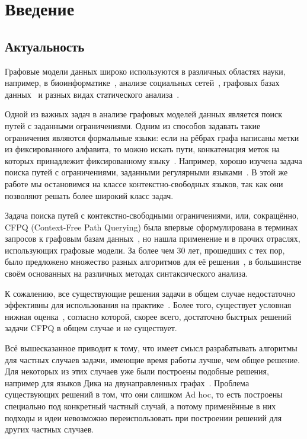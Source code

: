 \section*{Введение}

\subsection*{Актуальность}

Графовые модели данных широко используются в различных областях науки, например, в биоинформатике~\cite{Sevon08}, анализе социальных сетей~\cite{Zarrinkalam14, Chaudhary16}, графовых базах данных~\cite{Medeiros18,Yannakakis1990} и разных видах статического анализа~\cite{Reps1998}. 

Одной из важных задач в анализе графовых моделей данных является поиск путей с заданными ограничениями. Одним из способов задавать такие ограничения являются формальные языки: если на рёбрах графа написаны метки из фиксированного алфавита, то можно искать пути, конкатенация меток на которых принадлежит фиксированному языку~\cite{Barrett00}. Например, хорошо изучена задача поиска путей с ограничениями, заданными регулярными языками~\cite{Mendelzon1995}. В этой же работе мы остановимся на классе контекстно-свободных языков, так как они позволяют решать более широкий класс задач.

Задача поиска путей с контекстно-свободными ограничениями, или, сокращённо, CFPQ (Context-Free Path Querying) была впервые сформулирована в терминах запросов к графовым базам данных~\cite{Yannakakis1990}, но нашла применение и в прочих отраслях, использующих графовые модели. За более чем 30 лет, прошедших с тех пор, было предложено множество разных алгоритмов для её решения~\cite{Reps97, Hellings15, Santos18}, в большинстве своём основанных на различных методах синтаксического анализа. 

К сожалению, все существующие решения задачи в общем случае недостаточно эффективны для использования на практике~\cite{Kuijpers19}. Более того, существует условная нижная оценка~\cite{Heintze1997}, согласно которой, скорее всего, достаточно быстрых решений задачи CFPQ в общем случае и не существует.

Всё вышесказанное приводит к тому, что имеет смысл разрабатывать алгоритмы для частных случаев задачи, имеющие время работы лучше, чем общее решение. Для некоторых из этих случаев уже были построены подобные решения, например для языков Дика на двунаправленных графах~\cite{Yuan09,Chatterjee17}. Проблема существующих решений в том, что они слишком Ad hoc, то есть построены специально под конкретный частный случай, а потому применённые в них подходы и идеи невозможно переиспользовать при построении решений для других частных случаев.  


